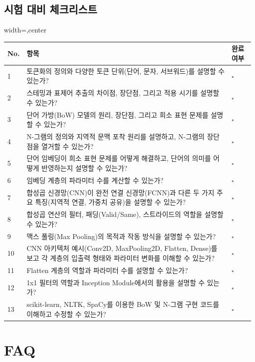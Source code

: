 \documentclass[11pt,a4paper]{article}
\theoremstyle{definition}
\begin{document}
\subsection{시험 대비 체크리스트}
\begin{adjustbox}{width=\textwidth,center}
\begin{tabular}{p{0.5cm}p{10cm}p{2cm}}
\toprule
\textbf{No.} & \textbf{항목} & \textbf{완료 여부} \\
\midrule
1 & 토큰화의 정의와 다양한 토큰 단위(단어, 문자, 서브워드)를 설명할 수 있는가? & \quad $\square$ \\
2 & 스테밍과 표제어 추출의 차이점, 장단점, 그리고 적용 시기를 설명할 수 있는가? & \quad $\square$ \\
3 & 단어 가방(BoW) 모델의 원리, 장단점, 그리고 희소 표현 문제를 설명할 수 있는가? & \quad $\square$ \\
4 & N-그램의 정의와 지역적 문맥 포착 원리를 설명하고, N-그램의 장단점을 열거할 수 있는가? & \quad $\square$ \\
5 & 단어 임베딩이 희소 표현 문제를 어떻게 해결하고, 단어의 의미를 어떻게 반영하는지 설명할 수 있는가? & \quad $\square$ \\
6 & 임베딩 계층의 파라미터 수를 계산할 수 있는가? & \quad $\square$ \\
7 & 합성곱 신경망(CNN)이 완전 연결 신경망(FCNN)과 다른 두 가지 주요 특징(지역적 연결, 가중치 공유)을 설명할 수 있는가? & \quad $\square$ \\
8 & 합성곱 연산의 필터, 패딩(Valid/Same), 스트라이드의 역할을 설명할 수 있는가? & \quad $\square$ \\
9 & 맥스 풀링(Max Pooling)의 목적과 작동 방식을 설명할 수 있는가? & \quad $\square$ \\
10 & CNN 아키텍처 예시(Conv2D, MaxPooling2D, Flatten, Dense)를 보고 각 계층의 입출력 형태와 파라미터 변화를 이해할 수 있는가? & \quad $\square$ \\
11 & Flatten 계층의 역할과 파라미터 수를 설명할 수 있는가? & \quad $\square$ \\
12 & 1x1 필터의 역할과 Inception Module에서의 활용을 설명할 수 있는가? & \quad $\square$ \\
13 & scikit-learn, NLTK, SpaCy를 이용한 BoW 및 N-그램 구현 코드를 이해하고 수정할 수 있는가? & \quad $\square$ \\
\bottomrule
\end{tabular}
\end{adjustbox}

\newpage
\section{FAQ}
\end{document}
